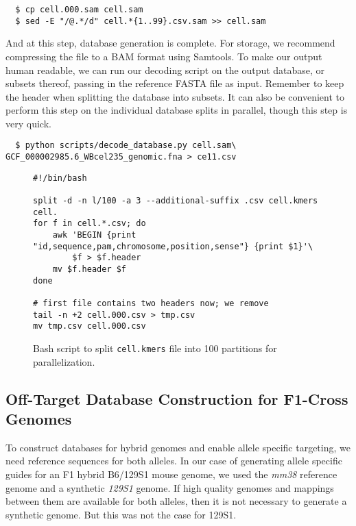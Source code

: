 \documentclass[11pt]{article}
\begin{document}
\begin{verbatim}
  $ cp cell.000.sam cell.sam
  $ sed -E "/@.*/d" cell.*{1..99}.csv.sam >> cell.sam
\end{verbatim}

And at this step, database generation is complete. For storage, we
recommend compressing the file to a BAM format using Samtools. To make
our output human readable, we can run our decoding script on the
output database, or subsets thereof, passing in the reference FASTA
file as input. Remember to keep the header when splitting the database
into subsets. It can also be convenient to perform this step on the
individual database splits in parallel, though this step is very
quick.

\vspace{-0.8em}
\begin{verbatim}
  $ python scripts/decode_database.py cell.sam\ GCF_000002985.6_WBcel235_genomic.fna > ce11.csv
\end{verbatim}

\begin{figure}[ht]
  \centering
\begin{verbatim}
#!/bin/bash

split -d -n l/100 -a 3 --additional-suffix .csv cell.kmers cell.
for f in cell.*.csv; do
    awk 'BEGIN {print "id,sequence,pam,chromosome,position,sense"} {print $1}'\
        $f > $f.header
    mv $f.header $f
done

# first file contains two headers now; we remove
tail -n +2 cell.000.csv > tmp.csv
mv tmp.csv cell.000.csv
\end{verbatim}
\caption{\label{fig:splitkmers} Bash script to split
  \texttt{cell.kmers} file into 100 partitions for parallelization.}
\end{figure}

\subsection{Off-Target Database Construction for F1-Cross Genomes}

To construct databases for hybrid genomes and enable allele specific
targeting, we need reference sequences for both alleles.  In our case
of generating allele specific guides for an F1 hybrid B6/129S1 mouse
genome, we used the \textit{mm38} reference genome and a synthetic
\textit{129S1} genome. If high quality genomes and mappings between them are
available for both alleles, then it is not necessary to generate a
synthetic genome. But this was not the case for 129S1.
\end{document}
